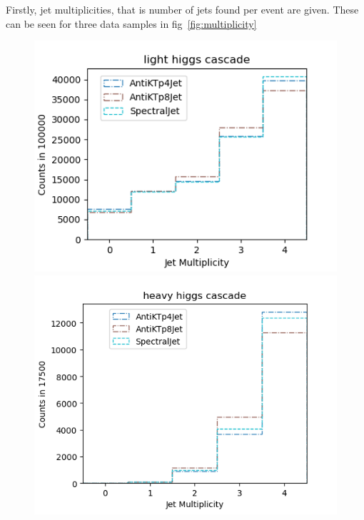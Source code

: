 Firstly, jet multiplicities, that is number of jets found per event are given.
These can be seen for three data samples in fig~\ref{fig:multiplicity}


\begin{figure}[htp]
    \begin{minipage}[c]{0.32\textwidth}
        \includegraphics[width=\textwidth]{graphics/multiplicity/light_higgs.png}
    \end{minipage}\hfill
    \begin{minipage}[c]{0.33\textwidth}
        \includegraphics[width=\textwidth]{graphics/multiplicity/heavy_higgs.png}
    \end{minipage}\hfill

\end{figure}
